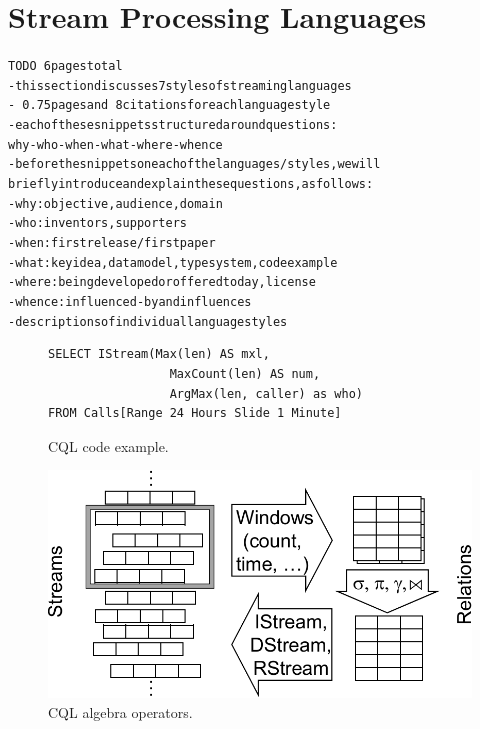 \section{Stream Processing Languages}\label{sec:languages}

\begin{alltt}TODO\scriptsize ~6 pages total
- this section discusses 7 styles of streaming languages
  - ~0.75 pages and ~8 citations for each language style
  - each of these snippets structured around questions:
    why-who-when-what-where-whence
- before the snippets on each of the languages/styles, we will
  briefly introduce and explain these questions, as follows:
  - why: objective, audience, domain
  - who: inventors, supporters
  - when: first release / first paper
  - what: key idea, data model, type system, code example
  - where: being developed or offered today, license
  - whence: influenced-by and influences
- descriptions of individual language styles
\end{alltt}

\begin{figure}[!h]
\begin{lstlisting}
SELECT IStream(Max(len) AS mxl,
                 MaxCount(len) AS num,
                 ArgMax(len, caller) as who)
FROM Calls[Range 24 Hours Slide 1 Minute]
\end{lstlisting}
\vspace*{-4mm}
\caption{\label{fig:cql}CQL code example.}
\end{figure}

\begin{figure}
\centerline{\includegraphics[scale=0.5]{cqlops.pdf}}
\vspace*{-4mm}
\caption{\label{fig:cqlops}CQL algebra operators.}
\end{figure}

